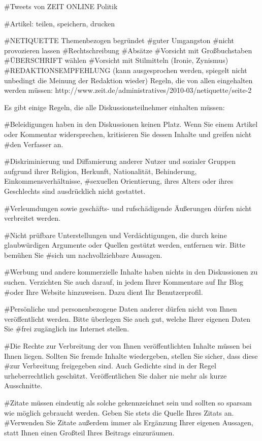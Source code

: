 #Tweets von ZEIT ONLINE Politik

#Artikel: teilen, speichern, drucken

#NETIQUETTE
Themenbezogen
begründet
#guter Umgangston 
#nicht provozieren lassen
#Rechtschreibung
#Absätze
#Vorsicht mit Großbuchstaben 
#ÜBERSCHRIFT wählen
#Vorsicht mit Stilmitteln (Ironie, Zynismus)
#REDAKTIONSEMPFEHLUNG (kann ausgesprochen werden, spiegelt nicht unbedingt die Meinung der Redaktion wieder)
Regeln, die von allen eingehalten werden müssen:
http://www.zeit.de/administratives/2010-03/netiquette/seite-2
 
 Es gibt einige Regeln, die alle Diskussionsteilnehmer einhalten müssen:
 
 #Beleidigungen haben in den Diskussionen keinen Platz. Wenn Sie einem Artikel oder Kommentar widersprechen, kritisieren Sie dessen Inhalte und greifen nicht #den Verfasser an.

#Diskriminierung und Diffamierung anderer Nutzer und sozialer Gruppen aufgrund ihrer Religion, Herkunft, Nationalität, Behinderung, Einkommensverhältnisse, #sexuellen Orientierung, ihres Alters oder ihres Geschlechts sind ausdrücklich nicht gestattet.

#Verleumdungen sowie geschäfts- und rufschädigende Äußerungen dürfen nicht verbreitet werden.

#Nicht prüfbare Unterstellungen und Verdächtigungen, die durch keine glaubwürdigen Argumente oder Quellen gestützt werden, entfernen wir. Bitte bemühen Sie #sich um nachvollziehbare Aussagen.

#Werbung und andere kommerzielle Inhalte haben nichts in den Diskussionen zu suchen. Verzichten Sie auch darauf, in jedem Ihrer Kommentare auf Ihr Blog #oder Ihre Website hinzuweisen. Dazu dient Ihr Benutzerprofil.

#Persönliche und personenbezogene Daten anderer dürfen nicht von Ihnen veröffentlicht werden. Bitte überlegen Sie auch gut, welche Ihrer eigenen Daten Sie #frei zugänglich ins Internet stellen.

#Die Rechte zur Verbreitung der von Ihnen veröffentlichten Inhalte müssen bei Ihnen liegen. Sollten Sie fremde Inhalte wiedergeben, stellen Sie sicher, dass diese #zur Verbreitung freigegeben sind. Auch Gedichte sind in der Regel urheberrechtlich geschützt. Veröffentlichen Sie daher nie mehr als kurze Ausschnitte.

#Zitate müssen eindeutig als solche gekennzeichnet sein und sollten so sparsam wie möglich gebraucht werden. Geben Sie stets die Quelle Ihres Zitats an. #Verwenden Sie Zitate außerdem immer als Ergänzung Ihrer eigenen Aussagen, statt Ihnen einen Großteil Ihres Beitrags einzuräumen.

